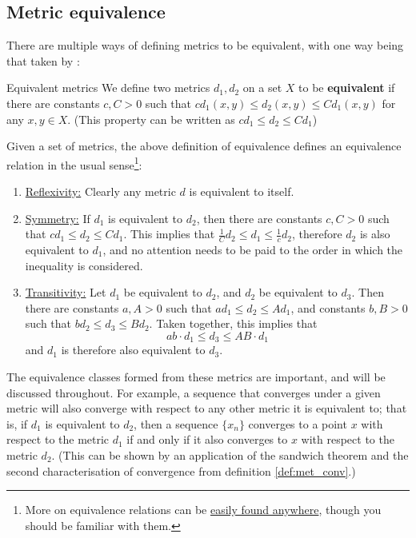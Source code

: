 \subsection{Metric equivalence}
There are multiple ways of defining metrics to be equivalent, with one way being that taken by \cite{folland}:
\begin{bdefin}{Equivalent metrics}{}
We define two metrics $d_{1},d_{2}$ on a set $X$ to be \textbf{equivalent} if there are constants $c,C>0$ such that  $c d_{1}(x,y) \leq d_{2}(x,y) \leq C d_{1}(x,y)$ for any $x,y\in X$. (This property can be written as \mbox{$c d_{1} \leq d_{2} \leq C d_{1}$})
\end{bdefin}
Given a set of metrics, the above definition of equivalence defines an equivalence relation in the usual sense\footnote{More on equivalence relations can be \href{https://en.wikipedia.org/wiki/Equivalence_relation}{easily found anywhere}, though you should be familiar with them.}:
\begin{enumerate}
    \item \underline{Reflexivity:} Clearly any metric $d$ is equivalent to itself.
    \item \underline{Symmetry:} If $d_{1}$ is equivalent to $d_{2}$, then there are constants $c,C>0$ such that \mbox{$c d_{1} \leq d_{2} \leq C d_{1}$}. This implies that $\frac{1}{C} d_{2} \leq d_{1} \leq \frac{1}{c} d_{2}$, therefore $d_{2}$ is also equivalent to $d_{1}$, and no attention needs to be paid to the order in which the inequality is considered.
    \item \underline{Transitivity:} Let $d_{1}$ be equivalent to $d_{2}$, and $d_{2}$ be equivalent to $d_{3}$. Then there are constants $a,A>0$ such that $a d_{1} \leq d_{2} \leq A d_{1}$, and constants $b,B>0$ such that $b d_{2} \leq d_{3} \leq B d_{2}$. Taken together, this implies that \[ ab \cdot d_{1} \leq d_{3} \leq AB \cdot d_{1} \] and $d_{1}$ is therefore also equivalent to $d_{3}$.
\end{enumerate}
The equivalence classes formed from these metrics are important, and will be discussed throughout.  For example, a sequence that converges under a given metric will also converge with respect to any other metric it is equivalent to; that is, if $d_{1}$ is equivalent to $d_{2}$, then a sequence $\{x_{n} \}$ converges to a point $x$ with respect to the metric $d_{1}$ if and only if it also converges to $x$ with respect to the metric $d_{2}$. (This can be shown by an application of the sandwich theorem and the second characterisation of convergence from definition \ref{def:met_conv}.)

